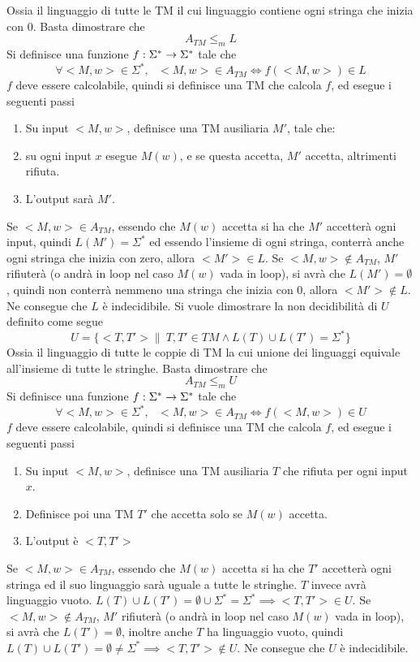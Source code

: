 \documentclass[10pt, letterpaper]{report}
\begin{document}
Ossia il linguaggio di tutte le TM il cui linguaggio contiene ogni stringa che inizia con 0.
Basta dimostrare che $$ A_{TM}\le_m  L$$Si definisce una funzione ${f:\Sigma^*\rightarrow \Sigma^*}$ tale che 
$$ \forall <M,w>\in\Sigma^*, \ \ \  <M,w>\in A_{TM}\iff f( <M,w>)\in L$$
$f$ deve essere calcolabile, quindi si definisce una TM che calcola $f$, ed esegue i seguenti passi 
\begin{enumerate}
    \item  Su input $<M,w>$, definisce una TM ausiliaria $M'$, tale che:
    \item su ogni input $x$ esegue $M(w)$, e se questa accetta, $M'$ accetta, altrimenti rifiuta.
    \item L'output sarà $M'$.
\end{enumerate}
\boxedMath{$\implies$} Se $<M,w>\in A_{TM}$, essendo che $M(w)$ accetta si ha che 
$M'$ accetterà ogni input, quindi $L(M')=\Sigma^*$ ed essendo l'insieme di ogni stringa, conterrà anche ogni stringa che inizia con zero, allora $<M'>\in L$.
\acc \boxedMath{$\impliedby$} Se $<M,w>\notin A_{TM}$, $M'$ rifiuterà  (o andrà in loop nel caso $M(w)$ vada in loop), si avrà che 
$L(M')=\emptyset$, quindi non conterrà nemmeno una stringa che inizia con 0, allora  $<M'>\notin L$.
Ne consegue che $L$ è indecidibile.
Si vuole dimostrare la non decidibilità di $U$ definito come segue 
$$ U=\{<T,T'> \| \ T,T'\in TM\land L(T)\cup L(T')=\Sigma^*\}$$ 
Ossia il linguaggio di tutte le coppie di TM la cui unione dei linguaggi equivale all'insieme di tutte le stringhe.
Basta dimostrare che $$ A_{TM}\le_m  U$$Si definisce una funzione ${f:\Sigma^*\rightarrow \Sigma^*}$ tale che 
$$ \forall <M,w>\in\Sigma^*, \ \ \  <M,w>\in A_{TM}\iff f( <M,w>)\in U$$
$f$ deve essere calcolabile, quindi si definisce una TM che calcola $f$, ed esegue i seguenti passi 
\begin{enumerate}
    \item  Su input $<M,w>$, definisce una TM ausiliaria $T$ che rifiuta per ogni input $x$. 
    \item Definisce poi una TM $T'$ che accetta solo se $M(w)$ accetta. 
    \item L'output è $<T,T'>$
\end{enumerate}
\boxedMath{$\implies$} Se $<M,w>\in A_{TM}$, essendo che $M(w)$ accetta si ha che
$T'$ accetterà ogni stringa ed il suo linguaggio sarà uguale a tutte le stringhe. $T$ invece avrà linguaggio vuoto. $L(T)\cup L(T')=\emptyset\cup \Sigma^*=\Sigma^*\implies <T,T'>\in U$.
\acc \boxedMath{$\impliedby$} Se $<M,w>\notin A_{TM}$, $M'$ rifiuterà  (o andrà in loop nel caso $M(w)$ vada in loop), si avrà che 
$L(T')=\emptyset$, inoltre anche $T$ ha linguaggio vuoto, quindi $L(T)\cup L(T')=\emptyset\ne \Sigma^*\implies <T,T'>\notin U$. Ne consegue che $U$ è indecidibile.
\end{document}
